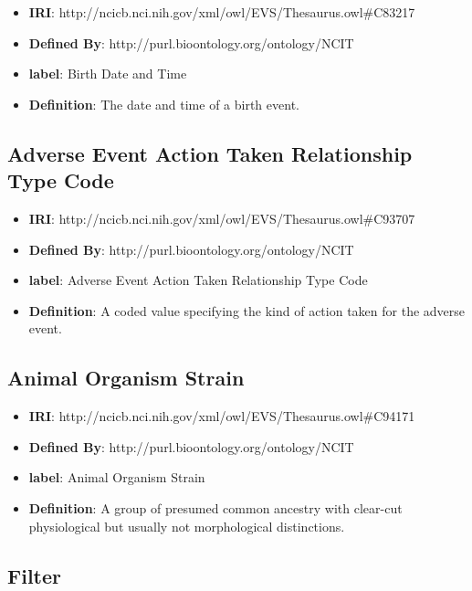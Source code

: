 \documentclass[a4paper,12pt,oneside]{article}
\begin{document}
  \begin{itemize}
     \item \textbf{IRI}: http://ncicb.nci.nih.gov/xml/owl/EVS/Thesaurus.owl\#C83217
     \item \textbf{Defined By}: http://purl.bioontology.org/ontology/NCIT
     \item \textbf{label}: Birth Date and Time
     \item \textbf{Definition}: The date and time of a birth event.
  \end{itemize}


  \subsection {Adverse Event Action Taken Relationship Type Code}

  \begin{itemize}
     \item \textbf{IRI}: http://ncicb.nci.nih.gov/xml/owl/EVS/Thesaurus.owl\#C93707
     \item \textbf{Defined By}: http://purl.bioontology.org/ontology/NCIT
     \item \textbf{label}: Adverse Event Action Taken Relationship Type Code
     \item \textbf{Definition}: A coded value specifying the kind of action taken for the adverse event.
  \end{itemize}


  \subsection {Animal Organism Strain}

  \begin{itemize}
     \item \textbf{IRI}: http://ncicb.nci.nih.gov/xml/owl/EVS/Thesaurus.owl\#C94171
     \item \textbf{Defined By}: http://purl.bioontology.org/ontology/NCIT
     \item \textbf{label}: Animal Organism Strain
     \item \textbf{Definition}: A group of presumed common ancestry with clear-cut physiological but usually not morphological distinctions.
  \end{itemize}


  \subsection {Filter}
\end{document}

